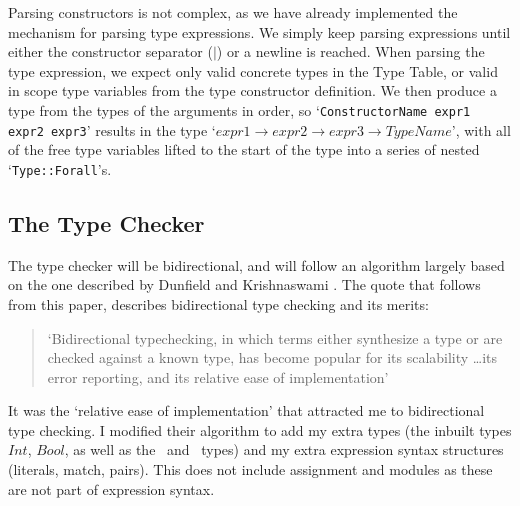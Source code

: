 Parsing constructors is not complex, as we have already implemented the mechanism for parsing type expressions. We simply keep parsing expressions until either the constructor separator ($\mid$) or a newline is reached. When parsing the type expression, we expect only valid concrete types in the Type Table, or valid in scope type variables from the type constructor definition. We then produce a type from the types of the arguments in order, so `\verb|ConstructorName expr1 expr2 expr3|' results in the type `\(expr1  \rightarrow expr2 \rightarrow expr3 \rightarrow  TypeName\)', with all of the free type variables lifted to the start of the type into a series of nested `\verb|Type::Forall|'s.

\newpage
\subsection{The Type Checker}
The type checker will be bidirectional, and will follow an algorithm largely based on the one described by Dunfield and Krishnaswami \cite{completebidir}. The quote that follows from this paper, describes bidirectional type checking and its merits: 
\begin{quote}
`Bidirectional typechecking, in which terms either synthesize a type or are checked against a known type, has become popular for its scalability \ldots its error reporting, and its relative ease of implementation' \cite{completebidir}
\end{quote}
\noindent It was the `relative ease of implementation' that attracted me to bidirectional type checking. I modified their algorithm to add my extra types (the inbuilt types $Int$, $Bool$, as well as the \Uniontype\ and \Producttype\ types) and my extra expression syntax structures (literals, match, pairs). This does not include assignment and modules as these are not part of expression syntax. 





